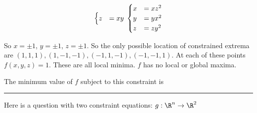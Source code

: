\documentclass{ximera}
\begin{document}
\begin{question}
\begin{solution}
\begin{hint}
\[\begin{cases}
						z &=  xy
					  \end{cases}\\
					  \\
					  \begin{cases}
						x &=  xz^2\\
						y &=  yx^2\\
						z &=  zy^2
					  \end{cases}
					\]
			\end{hint}
			\begin{hint}
				So $x=\pm 1$, $y= \pm 1$, $z = \pm 1$.  So the only possible location of constrained extrema are $(1,1,1),(1,-1,-1),(-1,1,-1),(-1,-1,1)$.  At each of these points
				$f(x,y,z) =1$.  These are all local minima.  $f$ has no local or global maxima.
			\end{hint}
			The minimum value of $f$ subject to this constraint is 
		\end{solution}
		
	\end{question}

	\hrule

	Here is a question with two constraint equations:  $g:\R^n \to \R^2$
	
\end{document}
